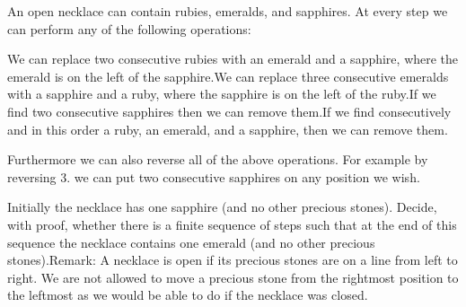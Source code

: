 An open necklace can contain rubies, emeralds, and sapphires. At every step we can perform any of the following operations:

We can replace two consecutive rubies with an emerald and a sapphire, where the emerald is on the left of the sapphire.We can replace three consecutive emeralds with a sapphire and a ruby, where the sapphire is on the left of the ruby.If we find two consecutive sapphires then we can remove them.If we find consecutively and in this order a ruby, an emerald, and a sapphire, then we can remove them.

Furthermore we can also reverse all of the above operations. For example by reversing 3. we can put two consecutive sapphires on any position we wish.

Initially the necklace has one sapphire (and no other precious stones). Decide, with proof, whether there is a finite sequence of steps such that at the end of this sequence the necklace contains one emerald (and no other precious stones).Remark: A necklace is open if its precious stones are on a line from left to right. We are not allowed to move a precious stone from the rightmost position to the leftmost as we would be able to do if the necklace was closed.